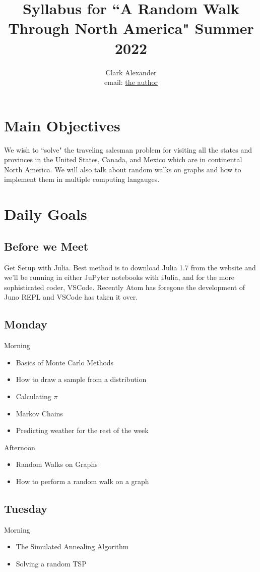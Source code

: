 \documentclass{article}
\title{Syllabus for ``A Random Walk Through North America" Summer 2022}
\author{Clark Alexander\\ email: \href{mailto:gcalexander1981@gmail.com}{the author}}
\theoremstyle{definition}
\theoremstyle{remark}
\begin{document}
\maketitle

\section{Main Objectives}

We wish to ``solve" the traveling salesman problem for visiting all the states and provinces in the United States, Canada, and Mexico which are in continental North America.  We will also talk about random walks on graphs and how to implement them in multiple computing langauges.

\section{Daily Goals}
\subsection{Before we Meet}
Get Setup with Julia.  Best method is to download Julia 1.7 from the website and we'll be running in either JuPyter notebooks with iJulia, and for the more sophisticated coder, VSCode.  Recently Atom has foregone the development of Juno REPL and VSCode has taken it over.  

\subsection{Monday}
Morning
\begin{itemize}
	\item Basics of Monte Carlo Methods
	\item How to draw a sample from a distribution
	\item Calculating $\pi$
	\item Markov Chains
	\item Predicting weather for the rest of the week
\end{itemize}
Afternoon
\begin{itemize}
	\item Random Walks on Graphs
	\item How to perform a random walk on a graph
\end{itemize}

\subsection{Tuesday}
Morning
\begin{itemize}
	\item The Simulated Annealing Algorithm
	\item Solving a random TSP
\end{itemize}
\end{document}
